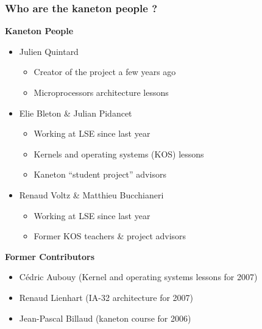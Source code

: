 \begin{frame}
  \frametitle{Who are the kaneton people ?}

  \-

  \textbf{Kaneton People}

  \begin{itemize}
    \item
      Julien Quintard
      \begin{itemize}
	\item Creator of the project a few years ago
        \item Microprocessors architecture lessons
      \end{itemize}
    \item
      Elie Bleton \& Julian Pidancet
      \begin{itemize}
	\item Working at LSE since last year
	\item Kernels and operating systems (KOS) lessons
        \item Kaneton ``student project'' advisors
      \end{itemize}
    \item
      Renaud Voltz \& Matthieu Bucchianeri
      \begin{itemize}
	\item Working at LSE since last year
	\item Former KOS teachers \& project advisors
      \end{itemize}
  \end{itemize}

  \textbf{Former Contributors}
  \begin{itemize}
    \item C\'{e}dric Aubouy (Kernel and operating systems lessons for 2007)
    \item Renaud Lienhart (IA-32 architecture for 2007)
    \item Jean-Pascal Billaud (kaneton course for 2006)
  \end{itemize}

\end{frame}



